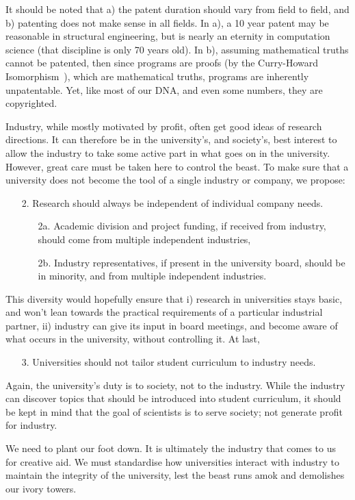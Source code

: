 \documentclass[draft,11pt,openright,monochrome,british,a4paper]{scrartcl}
\begin{document}
It should be noted that a) the patent duration should vary from field
to field, and b) patenting does not make sense in all fields. In a), a
10 year patent may be reasonable in structural engineering, but is
nearly an eternity in computation science (that discipline is only 70
years old). In b), assuming mathematical truths cannot be patented,
then since programs are proofs (by the Curry-Howard
Isomorphism~\cite{curryhoward}), which are mathematical truths,
programs are inherently unpatentable. Yet, like most of our DNA, and
even some numbers, they are copyrighted.

Industry, while mostly motivated by profit, often get good ideas of
research directions. It can therefore be in the university's, and
society's, best interest to allow the industry to take some active
part in what goes on in the university. However, great care must be
taken here to control the beast. To make sure that a university does
not become the tool of a single industry or company, we propose:
\begin{enumerate}
\item[2.] Research should always be independent of individual company
  needs.
  \begin{enumerate}
  \item[2a.] Academic division and project funding, if received from
    industry, should come from multiple independent industries,
  \item[2b.] Industry representatives, if present in the university
    board, should be in minority, and from multiple independent industries.
  \end{enumerate}
\end{enumerate}
This diversity would hopefully ensure that i) research in universities
stays basic, and won't lean towards the practical requirements of a
particular industrial partner, ii) industry can give its input in
board meetings, and become aware of what occurs in the university,
without controlling it. At last,
\begin{enumerate}
\item[3.] Universities should not tailor student curriculum to
  industry needs.
\end{enumerate}
Again, the university's duty is to society, not to the industry. While
the industry can discover topics that should be introduced into
student curriculum, it should be kept in mind that the goal of
scientists is to serve society; not generate profit for industry.

We need to plant our foot down. It is ultimately the industry that
comes to us for creative aid. We must standardise how universities
interact with industry to maintain the integrity of the university,
lest the beast runs amok and demolishes our ivory towers.
\end{document}
